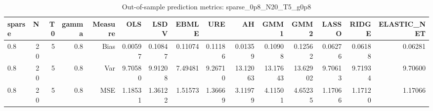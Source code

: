 \begin{table}[!htbp]\centering
\caption{Out-of-sample prediction metrics: sparse_0p8_N20_T5_g0p8}
\label{tab:table3_sparse_0p8_N20_T5_g0p8}
\begin{tabular}{lrrrrrrrrrrrrrr}
\hline
sparse & N & T0 & gamma & Measure & OLS & LSDV & EBMLE & URE & AH & GMM1 & GMM2 & LASSO & RIDGE & ELASTIC_NET \\
\hline
0.8 & 20 & 5 & 0.8 & Bias & 0.00597 & 0.10847 & 0.11074 & 0.11186 & 0.01359 & 0.10908 & 0.12562 & 0.06276 & 0.06188 & 0.06281 \\
0.8 & 20 & 5 & 0.8 & Var & 9.70580 & 9.91208 & 7.49481 & 9.26710 & 13.12063 & 13.17643 & 13.62902 & 9.70613 & 9.71934 & 9.70600 \\
0.8 & 20 & 5 & 0.8 & MSE & 1.18531 & 1.36122 & 1.51573 & 1.36669 & 3.11979 & 4.11501 & 4.65235 & 1.17066 & 1.17120 & 1.17066 \\
\hline
\end{tabular}
\end{table}

